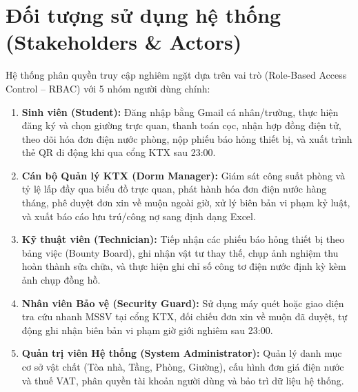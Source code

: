 \section{Đối tượng sử dụng hệ thống (Stakeholders \& Actors)}
Hệ thống phân quyền truy cập nghiêm ngặt dựa trên vai trò (Role-Based Access Control -- RBAC) với 5 nhóm người dùng chính:
\begin{enumerate}
    \item \textbf{Sinh viên (Student):} Đăng nhập bằng Gmail cá nhân/trường, thực hiện đăng ký và chọn giường trực quan, thanh toán cọc, nhận hợp đồng điện tử, theo dõi hóa đơn điện nước phòng, nộp phiếu báo hỏng thiết bị, và xuất trình thẻ QR di động khi qua cổng KTX sau 23:00.
    \item \textbf{Cán bộ Quản lý KTX (Dorm Manager):} Giám sát công suất phòng và tỷ lệ lấp đầy qua biểu đồ trực quan, phát hành hóa đơn điện nước hàng tháng, phê duyệt đơn xin về muộn ngoài giờ, xử lý biên bản vi phạm kỷ luật, và xuất báo cáo lưu trú/công nợ sang định dạng Excel.
    \item \textbf{Kỹ thuật viên (Technician):} Tiếp nhận các phiếu báo hỏng thiết bị theo bảng việc (Bounty Board), ghi nhận vật tư thay thế, chụp ảnh nghiệm thu hoàn thành sửa chữa, và thực hiện ghi chỉ số công tơ điện nước định kỳ kèm ảnh chụp đồng hồ.
    \item \textbf{Nhân viên Bảo vệ (Security Guard):} Sử dụng máy quét hoặc giao diện tra cứu nhanh MSSV tại cổng KTX, đối chiếu đơn xin về muộn đã duyệt, tự động ghi nhận biên bản vi phạm giờ giới nghiêm sau 23:00.
    \item \textbf{Quản trị viên Hệ thống (System Administrator):} Quản lý danh mục cơ sở vật chất (Tòa nhà, Tầng, Phòng, Giường), cấu hình đơn giá điện nước và thuế VAT, phân quyền tài khoản người dùng và bảo trì dữ liệu hệ thống.
\end{enumerate}

